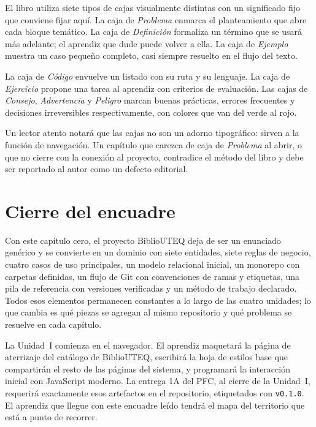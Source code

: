 El libro utiliza siete tipos de cajas visualmente distintas con un significado fijo que conviene fijar aqu\'i. La caja de \textit{Problema} enmarca el planteamiento que abre cada bloque tem\'atico. La caja de \textit{Definici\'on} formaliza un t\'ermino que se usar\'a m\'as adelante; el aprendiz que dude puede volver a ella. La caja de \textit{Ejemplo} muestra un caso peque\~no completo, casi siempre resuelto en el flujo del texto.

La caja de \textit{C\'odigo} envuelve un listado con su ruta y su lenguaje. La caja de \textit{Ejercicio} propone una tarea al aprendiz con criterios de evaluaci\'on. Las cajas de \textit{Consejo}, \textit{Advertencia} y \textit{Peligro} marcan buenas pr\'acticas, errores frecuentes y decisiones irreversibles respectivamente, con colores que van del verde al rojo.

Un lector atento notar\'a que las cajas no son un adorno tipogr\'afico: sirven a la funci\'on de navegaci\'on. Un cap\'itulo que carezca de caja de \textit{Problema} al abrir, o que no cierre con la conexi\'on al proyecto, contradice el m\'etodo del libro y debe ser reportado al autor como un defecto editorial.

\section{Cierre del encuadre}
\label{sec:u0:cierre}

Con este cap\'itulo cero, el proyecto BiblioUTEQ deja de ser un enunciado gen\'erico y se convierte en un dominio con siete entidades, siete reglas de negocio, cuatro casos de uso principales, un modelo relacional inicial, un monorepo con carpetas definidas, un flujo de Git con convenciones de ramas y etiquetas, una pila de referencia con versiones verificadas y un m\'etodo de trabajo declarado. Todos esos elementos permanecen constantes a lo largo de las cuatro unidades; lo que cambia es qu\'e piezas se agregan al mismo repositorio y qu\'e problema se resuelve en cada cap\'itulo.

La Unidad~I comienza en el navegador. El aprendiz maquetar\'a la p\'agina de aterrizaje del cat\'alogo de BiblioUTEQ, escribir\'a la hoja de estilos base que compartir\'an el resto de las p\'aginas del sistema, y programar\'a la interacci\'on inicial con JavaScript moderno. La entrega 1A del PFC, al cierre de la Unidad~I, requerir\'a exactamente esos artefactos en el repositorio, etiquetados con \texttt{v0.1.0}. El aprendiz que llegue con este encuadre le\'ido tendr\'a el mapa del territorio que est\'a a punto de recorrer.

\cleardoublepage
